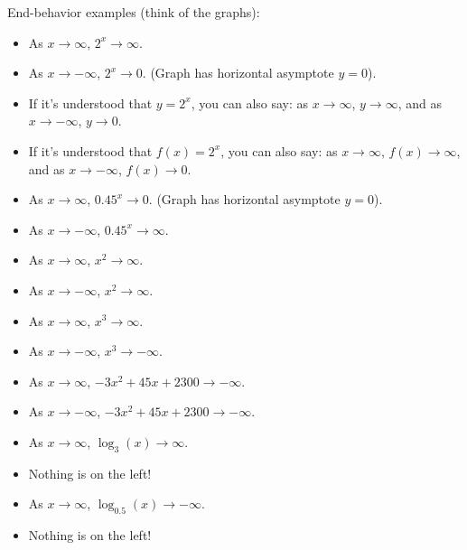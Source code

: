 \documentclass{amsbook}
\numberwithin{section}{chapter}
\numberwithin{equation}{chapter}
\begin{document}
End-behavior examples (think of the graphs):
\begin{itemize}
	\item As $x \to \infty$, $2^x \to \infty$.
	\item As $x \to -\infty$, $2^x \to 0$. (Graph has horizontal asymptote $y=0$).
	\item If it's understood that $y=2^x$, you can also say: as $x \to \infty$, $y \to \infty$, and as $x \to -\infty$, $y \to 0$.
	\item If it's understood that $f(x)=2^x$, you can also say: as $x \to \infty$, $f(x) \to \infty$, and as $x \to -\infty$, $f(x) \to 0$.
\end{itemize}

\bigskip
\begin{itemize}
	\item As $x \to \infty$, $0.45^x \to 0$. (Graph has horizontal asymptote $y=0$).
\item As $x \to -\infty$, $0.45^x \to \infty$.
\end{itemize}

\bigskip
\begin{itemize}
	\item As $x \to \infty$, $x^2 \to \infty$. 
	\item As $x \to -\infty$, $x^2 \to \infty$.
\end{itemize}


\bigskip
\begin{itemize}
	\item As $x \to \infty$, $x^3 \to \infty$. 
	\item As $x \to -\infty$, $x^3 \to -\infty$.
\end{itemize}


\bigskip
\begin{itemize}
	\item As $x \to \infty$, $-3x^2+45x+2300 \to -\infty$. 
	\item As $x \to -\infty$, $-3x^2+45x+2300 \to -\infty$.
\end{itemize}

\bigskip
\begin{itemize}
	\item As $x \to \infty$, $\log_3 (x) \to \infty$. 
	\item Nothing is on the left!
\end{itemize}

\bigskip
\begin{itemize}
	\item As $x \to \infty$, $\log_{0.5} (x) \to -\infty$. 
	\item Nothing is on the left!
\end{itemize}
\end{document}
